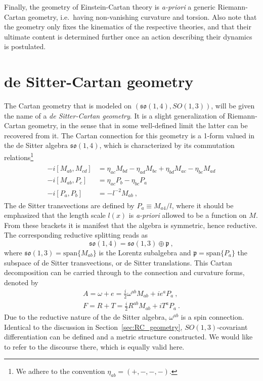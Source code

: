 \documentclass[11pt]{article}
\begin{document}
Finally, the geometry of Einstein-Cartan theory is 
\emph{a-priori} a generic Riemann-Cartan geometry, i.e.~having 
non-vanishing curvature and torsion. Also note that the geometry 
only fixes the kinematics of the respective theories, and that 
their ultimate content is determined further once an action 
describing their dynamics is postulated.


\section{de Sitter-Cartan geometry}
\label{sec:dSC_geometry}

The Cartan geometry that is modeled on $(\mathfrak{so}(1,4), 
SO(1,3))$, will be given the name of a \emph{de Sitter-Cartan 
	geometry}. It is a slight generalization of Riemann-Cartan 
geometry, in the sense that in some well-defined limit the latter 
can be recovered from it. The Cartan connection for this geometry 
is a 1-form valued in the de Sitter algebra $\mathfrak{so}(1,4)$, 
which is characterized by its commutation relations\footnote{We 
	adhere to the convention $\eta_{ab} = (+,-,-,-)$.}
\begin{gather}
\label{eq:comm_relations_so(1,4)}
\begin{aligned}
	-i[M_{ab},M_{cd}] &= \eta_{ac}M_{bd} - \eta_{ad}M_{bc} + 
	\eta_{bd}M_{ac} - \eta_{bc}M_{ad} \\
	-i[M_{ab},P_c] &= \eta_{ac}P_b- \eta_{bc}P_a\\
	-i[P_a,P_b] &= -l^{-2}M_{ab}~,
  \end{aligned}
\end{gather}
The de Sitter transvections are defined by $P_a \equiv M_{a4}/l$, 
where it should be emphasized that the length scale $l(x)$ is 
\emph{a-priori} allowed to be a function on $M$. From these 
brackets it is manifest that the algebra is symmetric, hence 
reductive.  The corresponding reductive splitting reads as
\begin{displaymath}
	\mathfrak{so}(1,4) = \mathfrak{so}(1,3) \oplus \mathfrak{p}~,
\end{displaymath}
where $\mathfrak{so}(1,3) = \mathrm{span}\{M_{ab}\}$ is the 
Lorentz subalgebra and $\mathfrak{p} = \mathrm{span}\{P_a\}$ the 
subspace of de Sitter transvections, or de Sitter translations.  
This Cartan decomposition can be carried through to the 
connection and curvature forms, denoted by
\begin{subequations}
\begin{gather}
	A = \omega + e = \tfrac{i}{2} \omega^{ab} M_{ab} + i e^a P_a~, 
	\\
	F = R + T = \tfrac{i}{2} R^{ab} M_{ab} + i T^a P_a~.
\end{gather}
\end{subequations}
Due to the reductive nature of the de Sitter algebra, 
$\omega^{ab}$ is a spin connection. Identical to the discussion 
in Section~\ref{sec:RC_geometry}, $SO(1,3)$-covariant 
differentiation can be defined and a metric structure 
constructed. We would like to refer to the discourse there, which 
is equally valid here.
\end{document}
